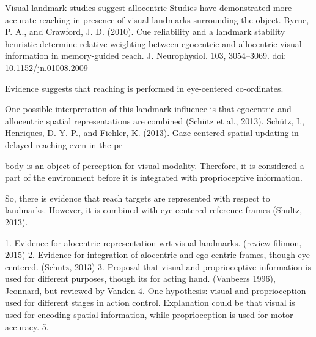 Visual landmark studies suggest allocentric
Studies have demonstrated more accurate reaching in presence of visual landmarks surrounding the object. 
Byrne, P. A., and Crawford, J. D. (2010). Cue reliability and a landmark stability heuristic determine relative weighting between egocentric and allocentric visual information in memory-guided reach. J. Neurophysiol. 103, 3054–3069. doi: 10.1152/jn.01008.2009


Evidence suggests that reaching is performed in eye-centered co-ordinates.

One possible interpretation of this landmark influence is that egocentric and allocentric spatial representations are combined (Schütz et al., 2013). Schütz, I., Henriques, D. Y. P., and Fiehler, K. (2013). Gaze-centered spatial updating in delayed reaching even in the pr


body is an object of perception for visual modality. Therefore, it is considered a part of the environment before it is integrated with proprioceptive information. 


So, there is evidence that reach targets are represented with respect to landmarks. 
However, it is combined with eye-centered reference frames (Shultz, 2013). 

1. Evidence for alocentric representation wrt visual landmarks. (review filimon, 2015)
2. Evidence for integration of alocentric and ego centric frames, though eye centered. (Schutz, 2013)
3. Proposal that visual and proprioceptive information is used for different purposes, though its for acting hand. (Vanbeers 1996), Jeonnard, but reviewed by Vanden
4. One hypothesis: visual and proprioception used for different stages in action control. Explanation could be that visual is used for encoding spatial information, while proprioception is used for motor accuracy.
5. 




